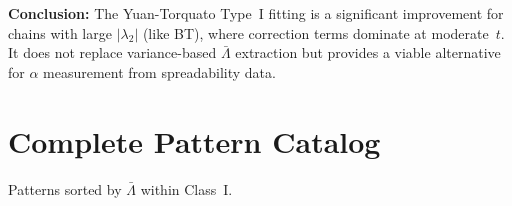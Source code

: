 \documentclass[11pt,letterpaper]{article}
\begin{document}
\textbf{Conclusion:} The Yuan-Torquato Type~I fitting is a significant improvement
for chains with large $|\lambda_2|$ (like BT), where correction terms dominate at
moderate~$t$. It does not replace variance-based $\bar\Lambda$ extraction but provides
a viable alternative for $\alpha$ measurement from spreadability data.

\section{Complete Pattern Catalog}

Patterns sorted by $\bar\Lambda$ within Class~I.

\vspace{0.4em}
\end{document}
